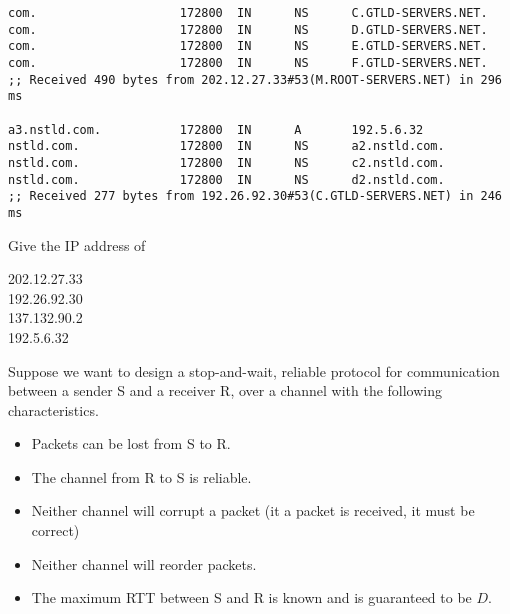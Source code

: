 \documentclass[a4paper,11pt,answers]{exam}
\begin{document}
\begin{questions}
\begin{verbatim}
com.                    172800  IN      NS      C.GTLD-SERVERS.NET.
com.                    172800  IN      NS      D.GTLD-SERVERS.NET.
com.                    172800  IN      NS      E.GTLD-SERVERS.NET.
com.                    172800  IN      NS      F.GTLD-SERVERS.NET.
;; Received 490 bytes from 202.12.27.33#53(M.ROOT-SERVERS.NET) in 296 ms

a3.nstld.com.           172800  IN      A       192.5.6.32
nstld.com.              172800  IN      NS      a2.nstld.com.
nstld.com.              172800  IN      NS      c2.nstld.com.
nstld.com.              172800  IN      NS      d2.nstld.com.
;; Received 277 bytes from 192.26.92.30#53(C.GTLD-SERVERS.NET) in 246 ms
\end{verbatim}
	
Give the IP address of

\begin{solution}
202.12.27.33\\
192.26.92.30\\
137.132.90.2\\
192.5.6.32
\end{solution}

\question
Suppose we want to design a stop-and-wait, reliable protocol for communication 
between a sender S and a receiver R, over a channel with the following 
characteristics.
\begin{itemize}
	\item Packets can be lost from S to R.
	\item The channel from R to S is reliable.
	\item Neither channel will corrupt a packet (it a packet is received, it
	      must be correct)
	\item Neither channel will reorder packets.
	\item The maximum RTT between S and R is known and is guaranteed to be $D$.
	\end{itemize}


\end{questions}
\end{document}
